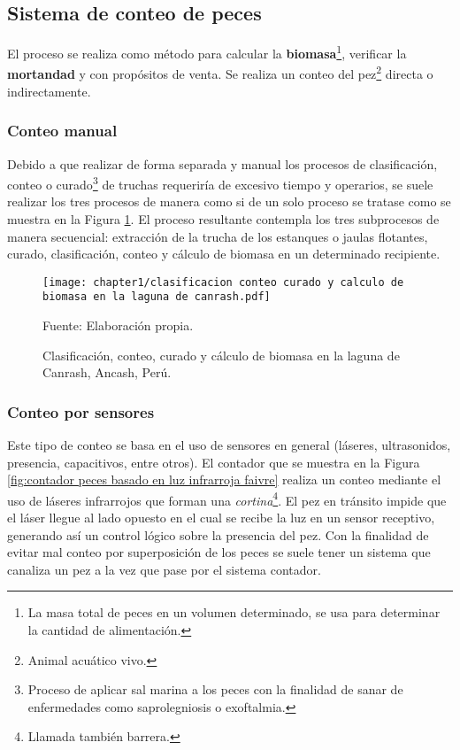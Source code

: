 \subsection{Sistema de conteo de peces}

El proceso se realiza como método para calcular la \textbf{biomasa}\footnote{La masa total de peces en un volumen determinado, se usa para determinar la cantidad de alimentación.}, verificar la \textbf{mortandad} y con propósitos de venta. Se realiza un conteo del pez\footnote{Animal acuático vivo.} directa o indirectamente. 

\subsubsection{Conteo manual}

Debido a que realizar de forma separada y manual los procesos de clasificación, conteo o curado\footnote{Proceso de aplicar sal marina a los peces con la finalidad de sanar de enfermedades como saprolegniosis o exoftalmia.}  de truchas requeriría de excesivo tiempo y operarios, se suele realizar los tres procesos de manera como si de un solo proceso se tratase como se muestra en la Figura \ref{fig:clasificacion conteo curado y calculo de biomasa en la laguna de canrash}. El proceso resultante contempla los tres subprocesos de manera secuencial: extracción de la trucha de los estanques o jaulas flotantes, curado, clasificación, conteo y cálculo de biomasa en un determinado recipiente.\\

\begin{figure}[H]
	\centering
	\texttt{[image: chapter1/clasificacion conteo curado y calculo de biomasa en la laguna de canrash.pdf]}
	\caption{Clasificación, conteo, curado y cálculo de biomasa en la laguna de Canrash, Ancash, Perú.}
	Fuente: Elaboración propia.
	\label{fig:clasificacion conteo curado y calculo de biomasa en la laguna de canrash}
\end{figure}

\subsubsection{Conteo por sensores}

Este tipo de conteo se basa en el uso de sensores en general (láseres, ultrasonidos, presencia, capacitivos, entre otros).  El contador que se muestra en la Figura \ref{fig:contador peces basado en luz infrarroja faivre} realiza un conteo mediante el uso de láseres infrarrojos que forman una \textit{cortina}\footnote{Llamada también barrera.}. El pez en tránsito impide que el láser llegue al lado opuesto en el cual se recibe la luz en un sensor receptivo, generando así un control lógico sobre la presencia del pez. Con la finalidad de evitar mal conteo por superposición de los peces se suele tener un sistema que canaliza un pez a la vez que pase por el sistema contador.

